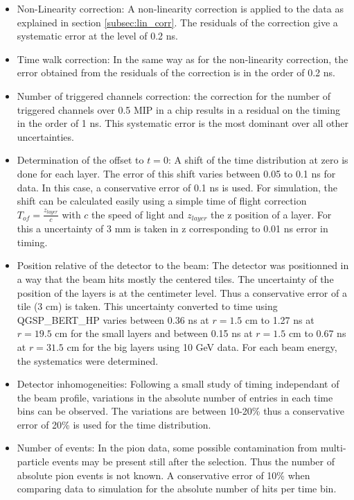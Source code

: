 \begin{itemize}
	\item Non-Linearity correction: A non-linearity correction is applied to the data as explained in section \ref{subsec:lin_corr}. The residuals of the correction give a systematic error at the level of 0.2 ns.
	\item Time walk correction: In the same way as for the non-linearity correction, the error obtained from the residuals of the correction is in the order of 0.2 ns.
	\item Number of triggered channels correction: the correction for the number of triggered channels over 0.5 MIP in a chip results in a residual on the timing in the order of 1 ns. This systematic error is the most dominant over all other uncertainties.
	\item Determination of the offset to $t=0$: A shift of the time distribution at zero is done for each layer. The error of this shift varies between 0.05 to 0.1 ns for data. In this case, a conservative error of 0.1 ns is used. For simulation, the shift can be calculated easily using a simple time of flight correction $T_{of} = \frac{z_{layer}}{c}$ with $c$ the speed of light and $z_{layer}$ the z position of a layer. For this a uncertainty of 3 mm is taken in z corresponding to 0.01 ns error in timing.
	\item Position relative of the detector to the beam: The detector was positionned in a way that the beam hits mostly the centered tiles. The uncertainty of the position of the layers is at the centimeter level. Thus a conservative error of a tile (3 cm) is taken. This uncertainty converted to time using QGSP\_BERT\_HP varies between 0.36 ns at $r = 1.5$ cm to 1.27 ns at $r = 19.5$ cm for the small layers and between 0.15 ns at $r = 1.5$ cm to 0.67 ns at $r = 31.5$ cm for the big layers using 10 GeV data. For each beam energy, the systematics were determined.
	\item Detector inhomogeneities: Following a small study of timing independant of the beam profile, variations in the absolute number of entries in each time bins can be observed. The variations are between 10-20\% thus a conservative error of 20\% is used for the time distribution.
	\item Number of events: In the pion data, some possible contamination from multi-particle events may be present still after the selection. Thus the number of absolute pion events is not known. A conservative error of 10\% when comparing data to simulation for the absolute number of hits per time bin.
\end{itemize}

